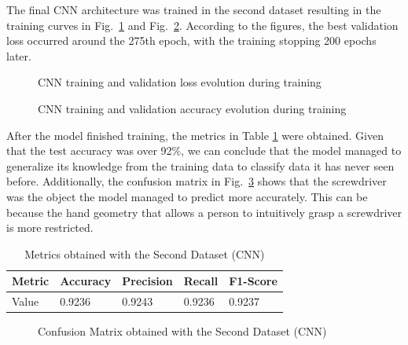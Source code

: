 The final CNN architecture was trained in the second dataset resulting in the training curves in Fig.~\ref{fig:cnn_loss} and Fig.~\ref{fig:cnn_acc}. According to the figures, the best validation loss occurred around the 275th epoch, with the training stopping 200 epochs later.

\begin{figure}[H]
    \centering
    {\fontsize{10}{12}\selectfont}
    \caption[CNN training and validation loss evolution during training]{CNN training and validation loss evolution during training}
    \label{fig:cnn_loss}
\end{figure}

\begin{figure}[H]
    \centering
    {\fontsize{10}{12}\selectfont}
    \caption[CNN training and validation accuracy evolution during training]{CNN training and validation accuracy evolution during training}
    \label{fig:cnn_acc}
\end{figure}

After the model finished training, the metrics in Table \ref{table:cnn_dataset2_results} were obtained. Given that the test accuracy was over 92\%, we can conclude that the model managed to generalize its knowledge from the training data to classify data it has never seen before. Additionally, the confusion matrix in Fig.~\ref{fig:cnn_dataset2_confusion_matrix} shows that the screwdriver was the object the model managed to predict more accurately. This can be because the hand geometry that allows a person to intuitively grasp a screwdriver is more restricted.

\begin{table}[H]
    \centering
    \caption{Metrics obtained with the Second Dataset (CNN)}
    \label{table:cnn_dataset2_results}
    \begin{tabular}{|l|l|l|l|l|}
        \hline
        Metric & Accuracy & Precision & Recall & F1-Score \\
        \hline
        Value & 0.9236 & 0.9243 & 0.9236 & 0.9237 \\
        \hline
    \end{tabular}
\end{table}

\begin{figure}[H]
    \centering
    {\fontsize{10}{12}\selectfont}
    \caption[Confusion Matrix obtained with the Second Dataset (CNN)]{Confusion Matrix obtained with the Second Dataset (CNN)}
    \label{fig:cnn_dataset2_confusion_matrix}
\end{figure}

